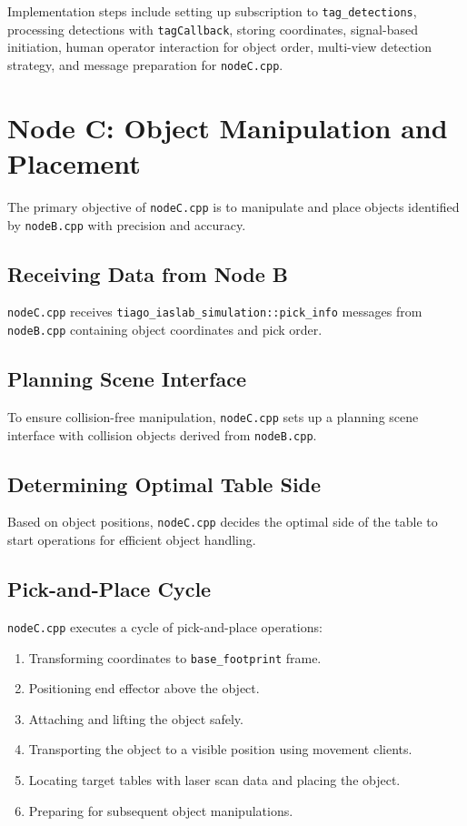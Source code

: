 \documentclass[a4paper]{article}
\begin{document}
Implementation steps include setting up subscription to \texttt{tag\_detections}, processing detections with \texttt{tagCallback}, storing coordinates, signal-based initiation, human operator interaction for object order, multi-view detection strategy, and message preparation for \texttt{nodeC.cpp}.


\section{Node C: Object Manipulation and Placement}

The primary objective of \texttt{nodeC.cpp} is to manipulate and place objects identified by \texttt{nodeB.cpp} with precision and accuracy.

\subsection{Receiving Data from Node B}

\texttt{nodeC.cpp} receives \texttt{tiago\_iaslab\_simulation::pick\_info} messages from \texttt{nodeB.cpp} containing object coordinates and pick order.

\subsection{Planning Scene Interface}

To ensure collision-free manipulation, \texttt{nodeC.cpp} sets up a planning scene interface with collision objects derived from \texttt{nodeB.cpp}.

\subsection{Determining Optimal Table Side}

Based on object positions, \texttt{nodeC.cpp} decides the optimal side of the table to start operations for efficient object handling.

\subsection{Pick-and-Place Cycle}

\texttt{nodeC.cpp} executes a cycle of pick-and-place operations:
\begin{enumerate}
    \item Transforming coordinates to \texttt{base\_footprint} frame.
    \item Positioning end effector above the object.
    \item Attaching and lifting the object safely.
    \item Transporting the object to a visible position using movement clients.
    \item Locating target tables with laser scan data and placing the object.
    \item Preparing for subsequent object manipulations.
\end{enumerate}
\end{document}
